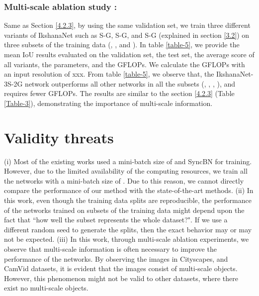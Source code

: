 \documentclass{article}
\begin{document}
\subsubsection{Multi-scale ablation study :}
\label{4.3.2}
Same as Section \ref{4.2.3}, by using the same validation set, we train three different variants of IkshanaNet such as S-G, S-G, and S-G (explained in section \ref{3.2}) on three subsets of the training data (, , and ). \newline
In table \ref{table-5}, we provide the mean IoU results evaluated on the validation set, the test set, the average score of all variants, the parameters, and the GFLOPs. We calculate the GFLOPs with an input resolution of xxx.\newline
From table \ref{table-5}, we observe that, the IkshanaNet-3S-2G network outperforms all other networks in all the subsets (,  ,  , ), and requires fewer GFLOPs. The results are similar to the section \ref{4.2.3} (Table \ref{Table-3}), demonstrating the importance of multi-scale information.


\section{Validity threats}
\label{validity-threats}
\noindent
(i) Most of the existing works \cite{chen2018encoder,zhao2017pyramid,10.1007/978-3-030-58539-6_11} used a mini-batch size of  and SyncBN \cite{rotabulo2017place,Zhang_2018_CVPR} for training. However, due to the limited availability of the computing resources, we train all the networks with a mini-batch size of . Due to this reason, we cannot directly compare the performance of our method with the state-of-the-art methods.\newline
(ii) In this work, even though the training data splits are reproducible, the performance of the networks trained on subsets of the training data might depend upon the fact that ``how well the subset represents the whole dataset?". If we use a different random seed to generate the splits, then the exact behavior may or may not be expected.\newline
(iii) In this work, through multi-scale ablation experiments, we observe that multi-scale information is often necessary to improve the performance of the networks. By observing the images in Cityscapes, and CamVid datasets,  it is evident that the images consist of multi-scale objects. However, this phenomenon might not be valid to other datasets, where there exist no multi-scale objects.
\end{document}
